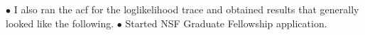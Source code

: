 \documentclass[11pt]{labbook}
\begin{document}

$\bullet$ I also ran the acf for the loglikelihood trace and obtained results that generally looked like the following.
\newline
{}
\newline
$\bullet$ Started NSF Graduate Fellowship application.
\end{document}
